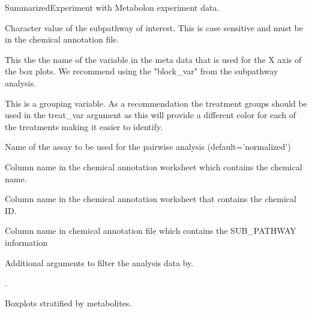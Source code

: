 \documentclass[a4paper]{book}
\begin{document}
\begin{Arguments}
\begin{ldescription}
\item[\code{data}] SummarizedExperiment with Metabolon experiment data.

\item[\code{subpathway}] Character value of the subpathway of interest. This is case
sensitive and must be in the chemical annotation file.

\item[\code{block\_var}] This the the name of the variable in the meta data that is
used for the X axis of the box plots. We recommend using the "block\_var"
from the subpathway analysis.

\item[\code{treat\_var}] This is a grouping variable. As a recommendation the
treatment groups should be used in the treat\_var argument as this will
provide a different color for each of the treatments making it easier to
identify.

\item[\code{Assay}] Name of the assay to be used for the pairwise analysis
(default='normalized')

\item[\code{CHEMICAL\_NAME}] Column name in the chemical annotation worksheet which
contains the chemical name.

\item[\code{CHEM\_ID}] Column name in the chemical annotation worksheet that contains
the chemical ID.

\item[\code{SUB\_PATHWAY}] Column name in chemical annotation file which contains
the SUB\_PATHWAY information

\item[\code{...}] Additional arguments to filter the analysis data by.
\end{ldescription}
\end{Arguments}
%
\begin{Details}
.
\end{Details}
%
\begin{Value}
Boxplots stratified by metabolites.
\end{Value}
%
\end{document}
